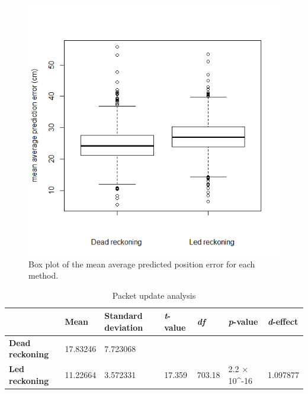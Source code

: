 \documentclass[journal]{IEEEtran}
\begin{document}
\begin{figure}[h]
    \centering
    \includegraphics[width=\linewidth]{FinalBoxPlotPosition.png}
    \caption{Box plot of the mean average predicted position error for each method.}
    \label{fig:boxplotdistance}
\end{figure}

\begin{table}[t]
	\centering
	\caption{Packet update analysis}
	\label{table:resultsupdates}
	\def\arraystretch{1.5}
	\begin{tabular}{|p{2.0cm}p{1.5cm}p{2.5cm}p{1.8cm}p{1.8cm}p{1.8cm}p{1.8cm}|}
		\hline
		& \textbf{Mean}
		& \textbf{Standard deviation}
		& \textbf{\textit{t}-value}
		& \textbf{\textit{df}}
		& \textbf{\textit{p}-value}
		& \textbf{\textit{d}-effect} \\ \hline
		\textbf{Dead reckoning}
		& 17.83246
		& 7.723068
		&  
		&  
		& 
		&  \\
		\textbf{Led reckoning}
		& 11.22664
		& 3.572331
		& 17.359
		& 703.18
		& 2.2 $\times$ 10^{-16} 
		& 1.097877 \\ \hline
	\end{tabular}
\end{table}
\end{document}
